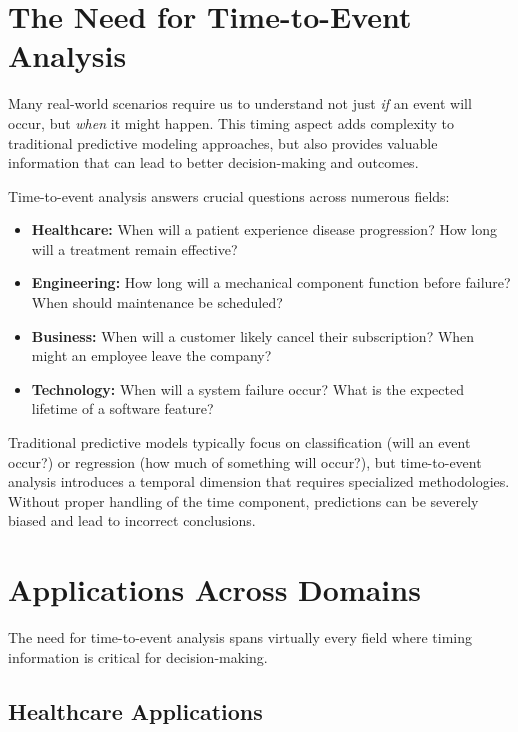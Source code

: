 \section{The Need for Time-to-Event Analysis}

Many real-world scenarios require us to understand not just \textit{if} an event will occur, but \textit{when} it might happen. This timing aspect adds complexity to traditional predictive modeling approaches, but also provides valuable information that can lead to better decision-making and outcomes.

\begin{notebox}[title=Time-to-Event Questions Across Domains]
  Time-to-event analysis answers crucial questions across numerous fields:
  \begin{itemize}
  \item \textbf{Healthcare:} When will a patient experience disease progression? How long will a treatment remain effective?
  \item \textbf{Engineering:} How long will a mechanical component function before failure? When should maintenance be scheduled?
  \item \textbf{Business:} When will a customer likely cancel their subscription? When might an employee leave the company?
  \item \textbf{Technology:} When will a system failure occur? What is the expected lifetime of a software feature?
  \end{itemize}
\end{notebox}

Traditional predictive models typically focus on classification (will an event occur?) or regression (how much of something will occur?), but time-to-event analysis introduces a temporal dimension that requires specialized methodologies. Without proper handling of the time component, predictions can be severely biased and lead to incorrect conclusions.

\section{Applications Across Domains}

The need for time-to-event analysis spans virtually every field where timing information is critical for decision-making.

\subsection{Healthcare Applications}

